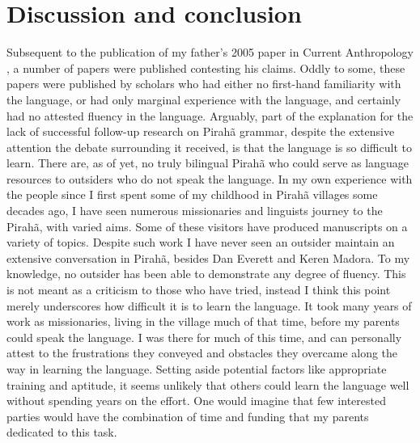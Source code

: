 \documentclass[output=paper,colorlinks,citecolor=brown
]{langscibook}
\begin{document}
\section{Discussion and conclusion}\label{sec:everett:4}

    Subsequent to the publication of my father’s 2005 paper in Current Anthropology \citep{everett2005cultural}, a number of papers were published contesting his claims. Oddly to some, these papers were published by scholars who had either no first-hand familiarity with the language, or had only marginal experience with the language, and certainly had no attested fluency in the language. Arguably, part of the explanation for the lack of successful follow-up research on Pirahã grammar, despite the extensive attention the debate surrounding it received, is that the language is so difficult to learn. There are, as of yet, no truly bilingual Pirahã who could serve as language resources to outsiders who do not speak the language. In my own experience with the people since I first spent some of my childhood in Pirahã villages some decades ago, I have seen numerous missionaries and linguists journey to the Pirahã, with varied aims. Some of these visitors have produced manuscripts on a variety of topics. Despite such work I have never seen an outsider maintain an extensive conversation in Pirahã, besides Dan Everett and Keren Madora. To my knowledge, no outsider has been able to demonstrate any degree of fluency. This is not meant as a criticism to those who have tried, instead I think this point merely underscores how difficult it is to learn the language. It took many years of work as missionaries, living in the village much of that time, before my parents could speak the language. I was there for much of this time, and can personally attest to the frustrations they conveyed and obstacles they overcame along the way in learning the language. Setting aside potential factors like appropriate training and aptitude, it seems unlikely that others could learn the language well without spending years on the effort. One would imagine that few interested parties would have the combination of time and funding that my parents dedicated to this task.\largerpage
    
\end{document}
